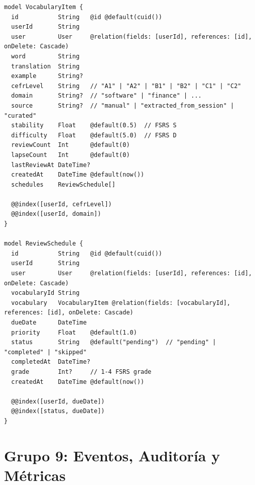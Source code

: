\begin{lstlisting}[style=sql,caption={Modelos de vocabulario y programación de repasos FSRS}]
model VocabularyItem {
  id           String   @id @default(cuid())
  userId       String
  user         User     @relation(fields: [userId], references: [id], onDelete: Cascade)
  word         String
  translation  String
  example      String?
  cefrLevel    String   // "A1" | "A2" | "B1" | "B2" | "C1" | "C2"
  domain       String?  // "software" | "finance" | ...
  source       String?  // "manual" | "extracted_from_session" | "curated"
  stability    Float    @default(0.5)  // FSRS S
  difficulty   Float    @default(5.0)  // FSRS D
  reviewCount  Int      @default(0)
  lapseCount   Int      @default(0)
  lastReviewAt DateTime?
  createdAt    DateTime @default(now())
  schedules    ReviewSchedule[]

  @@index([userId, cefrLevel])
  @@index([userId, domain])
}

model ReviewSchedule {
  id           String   @id @default(cuid())
  userId       String
  user         User     @relation(fields: [userId], references: [id], onDelete: Cascade)
  vocabularyId String
  vocabulary   VocabularyItem @relation(fields: [vocabularyId], references: [id], onDelete: Cascade)
  dueDate      DateTime
  priority     Float    @default(1.0)
  status       String   @default("pending")  // "pending" | "completed" | "skipped"
  completedAt  DateTime?
  grade        Int?     // 1-4 FSRS grade
  createdAt    DateTime @default(now())

  @@index([userId, dueDate])
  @@index([status, dueDate])
}
\end{lstlisting}

\section{Grupo 9: Eventos, Auditoría y Métricas}

